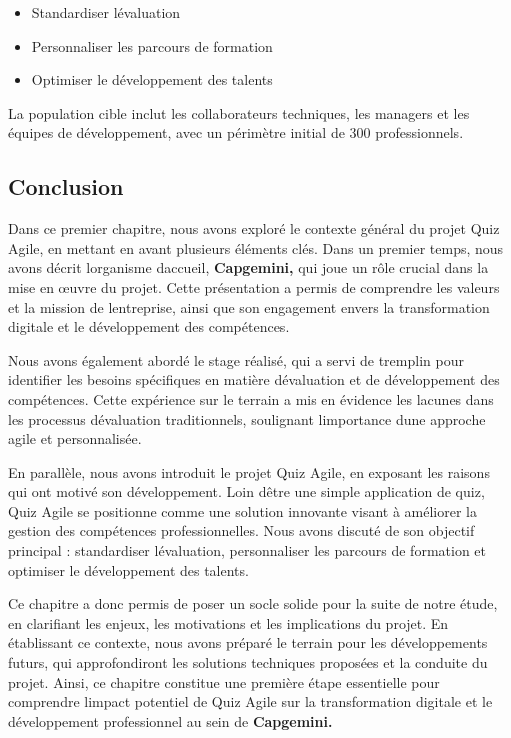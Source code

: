 \documentclass[12pt,a4paper,twoside,openright]{report}
\begin{document}
\begin{itemize}
\item
  Standardiser l\textquotesingle évaluation
\item
  Personnaliser les parcours de formation
\item
  Optimiser le développement des talents
\end{itemize}

La population cible inclut les collaborateurs techniques, les managers
et les équipes de développement, avec un périmètre initial de 300
professionnels.

\hypertarget{conclusion}{%
\subsection{Conclusion}\label{conclusion}}

Dans ce premier chapitre, nous avons exploré le contexte général du
projet Quiz Agile, en mettant en avant plusieurs éléments clés. Dans un
premier temps, nous avons décrit l\textquotesingle organisme
d\textquotesingle accueil, \textbf{Capgemini,} qui joue un rôle crucial
dans la mise en œuvre du projet. Cette présentation a permis de
comprendre les valeurs et la mission de l\textquotesingle entreprise,
ainsi que son engagement envers la transformation digitale et le
développement des compétences.

Nous avons également abordé le stage réalisé, qui a servi de tremplin
pour identifier les besoins spécifiques en matière
d\textquotesingle évaluation et de développement des compétences. Cette
expérience sur le terrain a mis en évidence les lacunes dans les
processus d\textquotesingle évaluation traditionnels, soulignant
l\textquotesingle importance d\textquotesingle une approche agile et
personnalisée.

En parallèle, nous avons introduit le projet Quiz Agile, en exposant les
raisons qui ont motivé son développement. Loin d\textquotesingle être
une simple application de quiz, Quiz Agile se positionne comme une
solution innovante visant à améliorer la gestion des compétences
professionnelles. Nous avons discuté de son objectif principal :
standardiser l\textquotesingle évaluation, personnaliser les parcours de
formation et optimiser le développement des talents.

Ce chapitre a donc permis de poser un socle solide pour la suite de
notre étude, en clarifiant les enjeux, les motivations et les
implications du projet. En établissant ce contexte, nous avons préparé
le terrain pour les développements futurs, qui approfondiront les
solutions techniques proposées et la conduite du projet. Ainsi, ce
chapitre constitue une première étape essentielle pour comprendre
l\textquotesingle impact potentiel de Quiz Agile sur la transformation
digitale et le développement professionnel au sein de
\textbf{Capgemini.}
\end{document}
